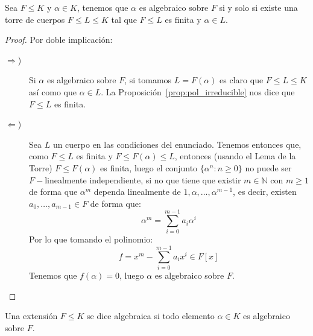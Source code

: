 \begin{prop}
    Sea $F\leq K$ y $\alpha\in K$, tenemos que $\alpha$ es algebraico sobre $F$ si y solo si existe una torre de cuerpos $F\leq L \leq K$ tal que $F\leq L$ es finita y $\alpha\in L$.
    \begin{proof}
        Por doble implicación:
        \begin{description}
            \item [$\Longrightarrow$)] Si $\alpha$ es algebraico sobre $F$, si tomamos $L = F(\alpha)$ es claro que $F\leq L\leq K$ así como que $\alpha\in L$. La Proposición~\ref{prop:pol_irreducible} nos dice que $F\leq L$ es finita.
            \item [$\Longleftarrow$)] Sea $L$ un cuerpo en las condiciones del enunciado. Tenemos entonces que, como $F\leq L$ es finita y $F\leq F(\alpha)\leq L$, entonces (usando el Lema de la Torre) $F\leq F(\alpha)$ es finita, luego el conjunto $\{\alpha^n : n\geq 0\}$ no puede ser $F-$linealmente independiente, si no que tiene que existir $m\in \mathbb{N}$ con $m\geq 1$ de forma que $\alpha^m$ dependa linealmente de $1,\alpha,\ldots,\alpha^{m-1}$, es decir, existen $a_0,\ldots,a_{m-1}\in F$ de forma que:
                \begin{equation*}
                    \alpha^m = \sum\limits_{i=0}^{m-1}a_i \alpha^i
                \end{equation*}
                Por lo que tomando el polinomio:
                \begin{equation*}
                    f = x^m - \sum\limits_{i=0}^{m-1}a_i x^i \in F[x]
                \end{equation*}
                Tenemos que $f(\alpha)=0$, luego $\alpha$ es algebraico sobre $F$.
        \end{description}
    \end{proof}
\end{prop}

\begin{definicion}
    Una extensión $F\leq K$ se dice algebraica si todo elemento $\alpha\in K$ es algebraico sobre $F$.
\end{definicion}

